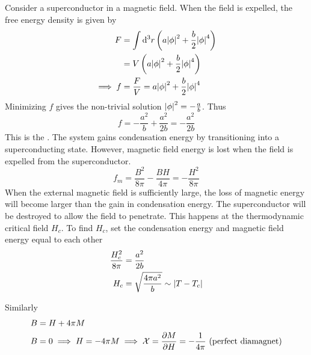 \documentclass[12pt,a4paper,titlepage]{article}
\newcommand{\trm}[1]{\textrm{#1}} %
\newcommand{\ul}[1]{\underline{\smash{#1}}} %
\newcommand{\Chi}{\mathcal{X}} %
\begin{document}
Consider a superconductor in a magnetic field. When the field is expelled, the free energy density is given by
\begin{equation}
\begin{aligned}
F&=\int\dd[3]{r}\left(a\abs{\phi}^{2}+\frac{b}{2}\abs{\phi}^{4}\right)\\
&=V\left(a\abs{\phi}^{2}+\frac{b}{2}\abs{\phi}^{4}\right)\\
\implies f&=\frac{F}{V}=a\abs{\phi}^{2}+\frac{b}{2}\abs{\phi}^{4}
\end{aligned}
\end{equation}
Minimizing $f$ gives the non-trivial solution $\abs{\phi}^{2}=-\frac{a}{b}$. Thus
\begin{equation}
f=-\frac{a^{2}}{b}+\frac{a^{2}}{2b}=-\frac{a^{2}}{2b}
\end{equation}
This is the \ul{condensation energy}. The system gains condensation energy by transitioning into a superconducting state. However, magnetic field energy is lost when the field is expelled from the superconductor.
\begin{equation}
f_{m}=\frac{B^{2}}{8\pi}-\frac{BH}{4\pi}=-\frac{H^{2}}{8\pi}
\end{equation}
When the external magnetic field is sufficiently large, the loss of magnetic energy will become larger than the gain in condensation energy. The superconductor will be destroyed to allow the field to penetrate. This happens at the thermodynamic critical field $H_{c}$. To find $H_{c}$, set the condensation energy and magnetic field energy equal to each other
\begin{equation}
\begin{aligned}
\frac{H_{c}^{2}}{8\pi}&=\frac{a^{2}}{2b}\\
H_{c}&=\sqrt{\frac{4\pi a^{2}}{b}}\sim\abs{T-T_{c}}
\end{aligned}
\end{equation}
\begin{center}
\end{center}
Similarly
\begin{equation}
\begin{aligned}
B&=H+4\pi M\\
B&=0\implies H=-4\pi M\implies\Chi=\pdv{M}{H}=-\frac{1}{4\pi}\trm{ (perfect diamagnet)}
\end{aligned}
\end{equation}
\end{document}

